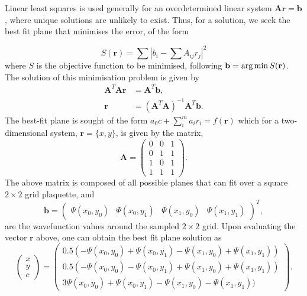  Linear least squares is used generally for an overdetermined linear system $\mathbf{A}\mathbf{r} = \mathbf{b}$, where unique solutions are unlikely to exist. Thus, for a solution, we seek the best fit plane that minimises the error, of the form

 \begin{equation}
 S(\mathbf{r}) = \displaystyle\sum |b_i - \displaystyle\sum A_{ij} r_j |^2
 \end{equation}
 where $S$ is the objective function to be minimised, following $\mathbf{b} = \operatorname*{arg\,min} S(\mathbf{r})$. The solution of this minimisation problem is given by
 \begin{subequations}
\begin{align}
    \mathbf{A} ^{T}\mathbf{A} \mathbf{r} &= \mathbf{A} ^{T}\mathbf{b}, \\
    \mathbf{r} &= (\mathbf{A}^{T}\mathbf{A})^{-1}\mathbf{A}^{T}\mathbf{b}.
\end{align}
\end{subequations}
The best-fit plane is sought of the form
$a_0 c + \displaystyle\sum\limits_{i}^{m} a_i r_i = f(\mathbf{r})$
which for a two-dimensional system, $\mathbf{r} = \{x,y\}$, is given by the matrix,
\begin{equation}
    \mathbf{A} = \left(
    \begin{array}{ccc}
        0 & 0 & 1 \\
        0 & 1 & 1 \\
        1 & 0 & 1 \\
        1 & 1 & 1
    \end{array}\right).
\end{equation}
The above matrix is composed of all possible planes that can fit over a square $2\times 2$ grid plaquette,
and
\begin{equation}
    \mathbf{b} = \left(
    \begin{array}{cccc}
        \Psi(x_0,y_0) & \Psi(x_0,y_1) & \Psi(x_1,y_0) & \Psi(x_1,y_1)
    \end{array} \right)^{T},
\end{equation}
are the wavefunction values around the sampled $2\times 2$ grid.
Upon evaluating the vector $\mathbf{r}$ above, one can obtain the best fit plane  solution as
\begin{equation}\left(
    \begin{array}{c}
        x \\
        y \\
        c
    \end{array}\right)
    = \left(
    \begin{array}{c}
        0.5( -\Psi(x_0,y_0) + \Psi(x_0,y_1) - \Psi(x_1,y_0) + \Psi(x_1,y_1) ) \\
        0.5( -\Psi(x_0,y_0) - \Psi(x_0,y_1) + \Psi(x_1,y_0) + \Psi(x_1,y_1) ) \\
        3\Psi(x_0,y_0) + \Psi(x_0,y_1) - \Psi(x_1,y_0) - \Psi(x_1,y_1) )
    \end{array}\right).
\end{equation}

